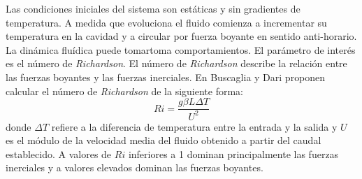 
Las condiciones iniciales del sistema son estáticas y sin gradientes de temperatura.
A medida que evoluciona el fluido comienza a incrementar su temperatura en la cavidad y a circular por fuerza boyante en sentido anti-horario.
La dinámica fluídica puede tomartoma comportamientos.
El parámetro de interés es el número de \textit{Richardson}.
El número de \textit{Richardson} describe la relación entre las fuerzas boyantes y las fuerzas inerciales.
En \cite{richardson} Buscaglia y Dari proponen calcular el número de \textit{Richardson} de la siguiente forma:
\begin{equation}
Ri = \frac{g \beta L \Delta T}{U^2}
\end{equation}
donde $\Delta T$ refiere a la diferencia de temperatura entre la entrada y la salida y $U$ es el módulo de la velocidad media del fluido obtenido a partir del caudal establecido.
A valores de $Ri$ inferiores a 1 dominan principalmente las fuerzas inerciales y a valores elevados dominan las fuerzas boyantes.

